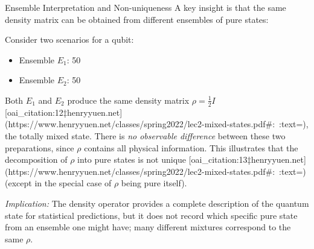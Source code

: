 \begin{frame}{Ensemble Interpretation and Non-uniqueness}
  A key insight is that the same density matrix can be obtained from different ensembles of pure states:
  \begin{example}
    Consider two scenarios for a qubit:
    \begin{itemize}
      \item Ensemble $E_1$: 50%
      \item Ensemble $E_2$: 50%
    \end{itemize}
    Both $E_1$ and $E_2$ produce the same density matrix $\rho = \frac{1}{2}I$ [oai_citation:12‡henryyuen.net](https://www.henryyuen.net/classes/spring2022/lec2-mixed-states.pdf#:~:text=), the totally mixed state. There is \textit{no observable difference} between these two preparations, since $\rho$ contains all physical information. This illustrates that the decomposition of $\rho$ into pure states is not unique [oai_citation:13‡henryyuen.net](https://www.henryyuen.net/classes/spring2022/lec2-mixed-states.pdf#:~:text=) (except in the special case of $\rho$ being pure itself).
  \end{example}
  \textit{Implication:} The density operator provides a complete description of the quantum state for statistical predictions, but it does not record which specific pure state from an ensemble one might have; many different mixtures correspond to the same $\rho$. 
\end{frame}

